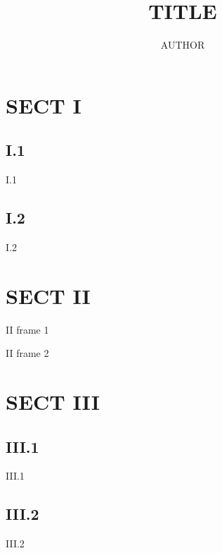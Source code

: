 \documentclass{beamer}
\title{TITLE}
\author{AUTHOR}
\begin{document}
\begin{frame}\maketitle\end{frame}

\section{SECT I}

\subsection{I.1}
\begin{frame}I.1\end{frame}

\subsection{I.2}
\begin{frame}I.2\end{frame}

\section{SECT II}
\begin{frame}II frame 1\end{frame}
\begin{frame}II frame 2\end{frame}

\section{SECT III}
\subsection{III.1}
\begin{frame}III.1\end{frame}

\subsection{III.2}
\begin{frame}III.2\end{frame}
\end{document}
